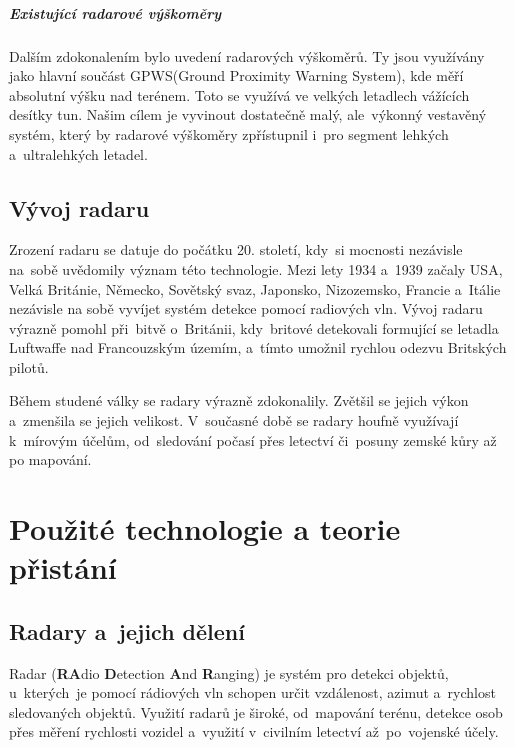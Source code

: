 		\paragraph{Existující radarové výškoměry}
		Dalším zdokonalením bylo uvedení radarových výškoměrů. Ty jsou využívány jako hlavní součást GPWS(Ground Proximity Warning System), kde měří absolutní výšku nad terénem. Toto se využívá ve velkých letadlech vážících desítky tun. Našim cílem je vyvinout dostatečně malý, ale~výkonný vestavěný systém, který by radarové výškoměry zpřístupnil i~pro segment lehkých a~ultralehkých letadel.
	
	\section{Vývoj radaru}
		Zrození radaru se datuje do počátku 20. století, kdy~si mocnosti nezávisle na~sobě uvědomily význam této technologie. Mezi lety 1934 a~1939 začaly USA, Velká Británie, Německo, Sovětský svaz, Japonsko, Nizozemsko, Francie a~Itálie nezávisle na sobě vyvíjet systém detekce pomocí radiových vln.\cite{history::radar} Vývoj radaru výrazně pomohl při~bitvě o~Británii, kdy~britové detekovali formující se letadla Luftwaffe nad Francouzským územím, a~tímto umožnil rychlou odezvu Britských pilotů.\par
			
		Během studené války se radary výrazně zdokonalily. Zvětšil se jejich výkon a~zmenšila se jejich velikost. V~současné době se radary houfně využívají k~mírovým účelům, od~sledování počasí přes letectví či~posuny zemské kůry až po mapování.
		
\chapter{Použité technologie a teorie přistání}
	
	\section{Radary a~jejich dělení}\label{uvod::radary}
		Radar (\textbf{RA}dio \textbf{D}etection \textbf{A}nd \textbf{R}anging) je systém pro detekci objektů, u~kterých~je pomocí rádiových vln schopen určit vzdálenost, azimut a~rychlost sledovaných objektů. Využití radarů je široké, od~mapování terénu, detekce osob přes měření rychlosti vozidel a~využití v~civilním letectví až~po~vojenské účely.	
			
